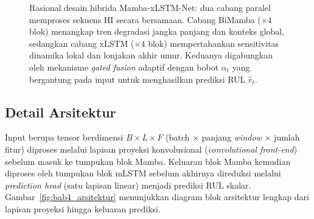 \begin{figure}[ht]
{%
  }
  \caption{Rasional desain hibrida Mamba-xLSTM-Net: dua cabang paralel
           memproses sekuens HI secara bersamaan. Cabang BiMamba ($\times 4$ blok)
           menangkap tren degradasi jangka panjang dan konteks global, sedangkan
           cabang xLSTM ($\times 4$ blok) mempertahankan sensitivitas dinamika
           lokal dan lonjakan akhir umur. Keduanya digabungkan oleh mekanisme
           \emph{gated fusion} adaptif dengan bobot $\alpha_t$ yang bergantung
           pada input untuk menghasilkan prediksi RUL $\hat{r}_t$.}
  \label{fig:bab4_rasional}
\end{figure}

\subsection{Detail Arsitektur}
\label{subsec:bab4_detail}

Input berupa tensor berdimensi $B \times L \times F$ (batch × panjang
\emph{window} × jumlah fitur) diproses melalui lapisan proyeksi
konvolusional (\emph{convolutional front-end}) sebelum masuk ke tumpukan
blok Mamba.
Keluaran blok Mamba kemudian diproses oleh tumpukan blok mLSTM sebelum
akhirnya direduksi melalui \emph{prediction head} (satu lapisan linear)
menjadi prediksi RUL skalar. Gambar~\ref{fig:bab4_arsitektur} menunjukkan
diagram blok arsitektur lengkap dari lapisan proyeksi hingga keluaran prediksi.

